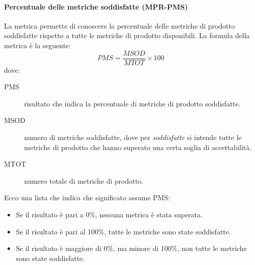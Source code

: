 \documentclass[../../norme-di-progetto.tex]{subfiles}
\begin{document}
\paragraph{Percentuale delle metriche soddisfatte (MPR-PMS)}%
\label{par:percentuale_delle_metriche_soddisfatte}

La metrica permette di conoscere la percentuale delle metriche di prodotto soddisfatte rispetto a tutte le metriche di prodotto disponibili.
La formula della metrica è la seguente:
\[
  PMS = \frac{MSOD}{MTOT} \times 100
\]
dove:
\begin{description}
  \item[PMS] risultato che indica la percentuale di metriche di prodotto soddisfatte.
  \item[MSOD] numero di metriche soddisfatte, dove per \textit{soddisfatte} si intende tutte le metriche di prodotto che hanno superato una certa soglia di accettabilità.
  \item[MTOT] numero totale di metriche di prodotto.
\end{description}

Ecco una lista che indica che significato assume PMS\@:
\begin{itemize}
  \item Se il risultato è pari a 0\%, nessuna metrica è stata superata.
  \item Se il risultato è pari al 100\%, tutte le metriche sono state soddisfatte.
  \item Se il risultato è maggiore di 0\%, ma minore di 100\%, non tutte le metriche sono state soddisfatte.
\end{itemize}


\end{document}
